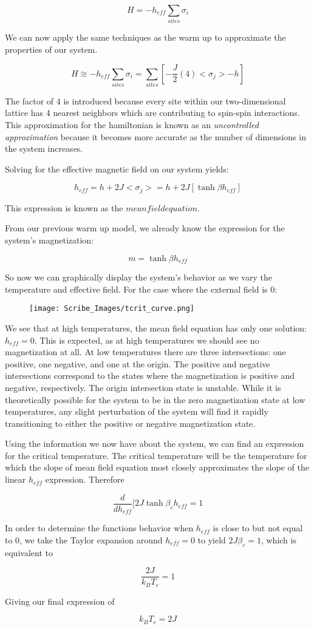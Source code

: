 \documentclass{article}
\newcommand{\bltz}{k_{B}}
\newcommand{\sigi}{\sigma_{i}}
\newcommand{\sigj}{\sigma_{j}}
\begin{document}
$$H=-h_{eff}\sum_{sites}\sigi$$

We can now apply the same techniques as the warm up to approximate the properties of our system.

$$H\cong-h_{eff}\sum_{sites}\sigi=\sum_{sites}[-\frac{J}{2}(4)<\sigj>-h]$$

The factor of 4 is introduced because every site within our two-dimensional lattice has 4 nearest neighbors which are contributing to spin-spin interactions.  This approximation for the hamiltonian is known as an \textit{uncontrolled approximation} because it becomes more accurate as the number of dimensions in the system increases.

Solving for the effective magnetic field on our system yields:

$$h_{eff}=h+2J<\sigj>=h+2J[\tanh{\beta h_{eff}}]$$

This expression is known as the $mean field equation$.

From our previous warm up model, we already know the expression for the system's magnetization:

$$m=\tanh{\beta h_{eff}}$$  

So now we can graphically display the system's behavior as we vary the temperature and effective field.  For the case where the external field is 0:

\begin{figure}
	\texttt{[image: Scribe\_Images/tcrit\_curve.png]}
\end{figure}

We see that at high temperatures, the mean field equation has only one solution: $h_{eff}=0$.  This is expected, as at high temperatures we should see no magnetization at all.  At low temperatures there are three intersections: one positive, one negative, and one at the origin.  The positive and negative intersections correspond to the states where the magnetization is positive and negative, respectively.  The origin intersection state is unstable.  While it is theoretically possible for the system to be in the zero magnetization state at low temperatures, any slight perturbation of the system will find it rapidly transitioning to either the positive or negative magnetization state.  

Using the information we now have about the system, we can find an expression for the critical temperature.  The critical temperature will be the temperature for which the slope of mean field equation most closely approximates the slope of the linear $h_{eff}$ expression.  Therefore

$$\frac{d}{dh_{eff}}[2J\tanh{\beta_{c}h_{eff}}=1$$

In order to determine the functions behavior when $h_{eff}$ is close to but not equal to 0, we take the Taylor expansion around $h_{eff}=0$ to yield $2J\beta_{c}=1$, which is equivalent to 

$$\frac{2J}{\bltz T_{c}}=1$$

Giving our final expression of 

$$\bltz T_{c}=2J$$
	

 



  
    
\end{document}

